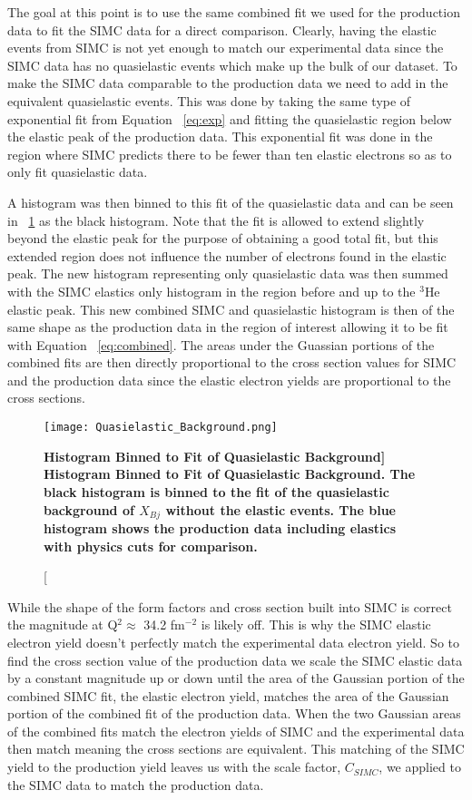 The goal at this point is to use the same combined fit we used for the production data to fit the SIMC data for a direct comparison. Clearly, having the elastic events from SIMC is not yet enough to match our experimental data since the SIMC data has no quasielastic events which make up the bulk of our dataset. To make the SIMC data comparable to the production data we need to add in the equivalent quasielastic events. This was done by taking the same type of exponential fit from Equation ~\ref{eq:exp} and fitting the quasielastic region below the elastic peak of the production data. This exponential fit was done in the region where SIMC predicts there to be fewer than ten elastic electrons so as to only fit quasielastic data. 

A histogram was then binned to this fit of the quasielastic data and can be seen in ~\ref{fig:QE_background} as the black histogram. Note that the fit is allowed to extend slightly beyond the elastic peak for the purpose of obtaining a good total fit, but this extended region does not influence the number of electrons found in the elastic peak. The new histogram representing only quasielastic data was then summed with the SIMC elastics only histogram in the region before and up to the $^3$He elastic peak. This new combined SIMC and quasielastic histogram is then of the same shape as the production data in the region of interest allowing it to be fit with Equation ~\ref{eq:combined}. The areas under the Guassian portions of the combined fits are then directly proportional to the cross section values for SIMC and the production data since the elastic electron yields are proportional to the cross sections. 

\begin{figure}[!ht]
\begin{center}
\texttt{[image: Quasielastic\_Background.png]}
\end{center}
\caption[\bf{Histogram Binned to Fit of Quasielastic Background}]{
{\bf{Histogram Binned to Fit of Quasielastic Background.}} The black histogram is binned to the fit of the quasielastic background of $X_{Bj}$ without the elastic events. The blue histogram shows the production data including elastics with physics cuts for comparison.}
\label{fig:QE_background}
\end{figure}

While the shape of the form factors and cross section built into SIMC is correct the magnitude at Q$^2 \approx$ 34.2 fm$^{-2}$ is likely off. This is why the SIMC elastic electron yield doesn't perfectly match the experimental data electron yield. So to find the cross section value of the production data we scale the SIMC elastic data by a constant magnitude up or down until the area of the Gaussian portion of the combined SIMC fit, the elastic electron yield, matches the area of the Gaussian portion of the combined fit of the production data. When the two Gaussian areas of the combined fits match the electron yields of SIMC and the experimental data then match meaning the cross sections are equivalent. This matching of the SIMC yield to the production yield leaves us with the scale factor, $C_{SIMC}$, we applied to the SIMC data to match the production data. 

